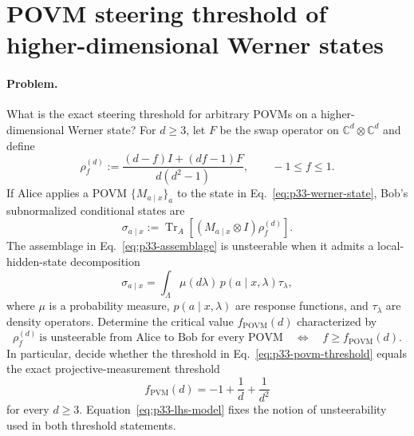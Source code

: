 \section{POVM steering threshold of higher-dimensional Werner states}
\label{sec:problem-33}

\paragraph{Problem.}
What is the exact steering threshold for arbitrary POVMs on a
higher-dimensional Werner state?  For $d\geq3$, let $F$ be the swap operator
on $\mathbb C^d\otimes\mathbb C^d$ and define
\begin{equation}
  \rho_f^{(d)}
  :=\frac{(d-f)I+(df-1)F}{d(d^2-1)},
  \qquad -1\leq f\leq1.
  \label{eq:p33-werner-state}
\end{equation}
If Alice applies a POVM $\{M_{a\mid x}\}_a$ to the state in
Eq.~\eqref{eq:p33-werner-state}, Bob's subnormalized conditional states are
\begin{equation}
  \sigma_{a\mid x}
  :=\operatorname{Tr}_A\!\left[
    (M_{a\mid x}\otimes I)\rho_f^{(d)}
    \right].
  \label{eq:p33-assemblage}
\end{equation}
The assemblage in Eq.~\eqref{eq:p33-assemblage} is unsteerable when it admits
a local-hidden-state decomposition
\begin{equation}
  \sigma_{a\mid x}
  =\int_\Lambda\mu(d\lambda)\,
    p(a\mid x,\lambda)\tau_\lambda,
  \label{eq:p33-lhs-model}
\end{equation}
where $\mu$ is a probability measure, $p(a\mid x,\lambda)$ are response
functions, and $\tau_\lambda$ are density operators.  Determine the critical
value $f_{\mathrm{POVM}}(d)$ characterized by
\begin{equation}
  \rho_f^{(d)}\ \text{is unsteerable from Alice to Bob for every POVM}
  \quad\Longleftrightarrow\quad
  f\geq f_{\mathrm{POVM}}(d).
  \label{eq:p33-povm-threshold}
\end{equation}
In particular, decide whether the threshold in
Eq.~\eqref{eq:p33-povm-threshold} equals the exact projective-measurement
threshold
\begin{equation}
  f_{\mathrm{PVM}}(d)=-1+\frac1d+\frac1{d^2}
  \label{eq:p33-pvm-threshold}
\end{equation}
for every $d\geq3$.  Equation~\eqref{eq:p33-lhs-model} fixes the notion of
unsteerability used in both threshold statements.

